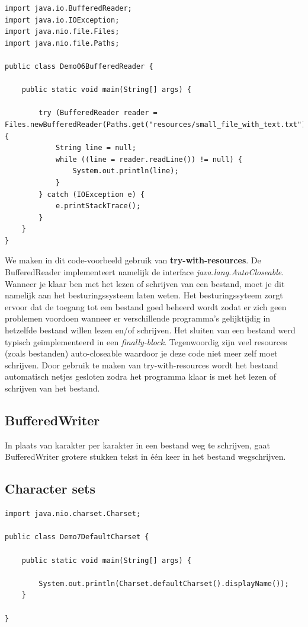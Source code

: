 \begin{lstlisting}
import java.io.BufferedReader;
import java.io.IOException;
import java.nio.file.Files;
import java.nio.file.Paths;

public class Demo06BufferedReader {

	public static void main(String[] args) {

		try (BufferedReader reader =  Files.newBufferedReader(Paths.get("resources/small_file_with_text.txt"))) {
			String line = null;
			while ((line = reader.readLine()) != null) {
				System.out.println(line);
			}
		} catch (IOException e) {
			e.printStackTrace();
		}
	}
}
\end{lstlisting}

We maken in dit code-voorbeeld gebruik van \textbf{try-with-resources}.
De BufferedReader implementeert namelijk de interface \textit{java.lang.AutoCloseable}. Wanneer je klaar ben met het lezen of schrijven van een bestand, moet je dit namelijk aan het besturingssysteem laten weten. Het besturingssyteem zorgt ervoor dat de toegang tot een bestand goed beheerd wordt zodat er zich geen problemen voordoen wanneer er verschillende programma's gelijktijdig in hetzelfde bestand willen lezen en/of schrijven. Het sluiten van een bestand werd typisch ge\"implementeerd in een \textit{finally-block}. Tegenwoordig zijn veel resources (zoals bestanden) auto-closeable waardoor je deze code niet meer zelf moet schrijven. Door gebruik te maken van try-with-resources wordt het bestand automatisch netjes gesloten zodra het programma klaar is met het lezen of schrijven van het bestand.

\subsection{BufferedWriter}

In plaats van karakter per karakter in een bestand weg te schrijven, gaat BufferedWriter grotere stukken tekst in \'e\'en keer in het bestand wegschrijven. 




\subsection{Character sets}

\begin{lstlisting}
import java.nio.charset.Charset;

public class Demo7DefaultCharset {

	public static void main(String[] args) {

		System.out.println(Charset.defaultCharset().displayName());
	}

}
\end{lstlisting}


